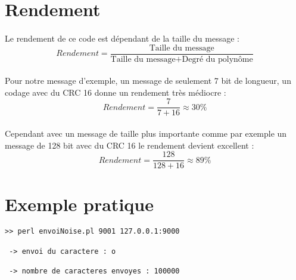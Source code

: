         \paragraph{}



    \section{Rendement}

        \paragraph{}
Le rendement de ce code est dépendant de la taille du message :
\[  Rendement = \frac{\text{Taille du message}}{\text{Taille du message} + \text{Degré du polynôme}} \]
        \paragraph{}
Pour notre message d'exemple, un message de seulement 7 bit de longueur, un codage avec du CRC 16 donne un rendement très médiocre :
\[  Rendement = \frac{7}{7 + 16} \approx 30\%  \]
        \paragraph{}
Cependant avec un message de taille plus importante comme par exemple un message de 128 bit avec du CRC 16 le rendement devient excellent :
\[  Rendement = \frac{128}{128 + 16} \approx 89\%  \]


    \section{Exemple pratique}
           \lstset{
                language=bash, basicstyle=\ttfamily\small, columns=flexible,
                tabsize=2, extendedchars=true, showspaces=false,
                showstringspaces=false, numbers=left, numberstyle=\tiny,
                breaklines=true, breakautoindent=true, captionpos=b
            }

    \begin{lstlisting}
>> perl envoiNoise.pl 9001 127.0.0.1:9000

 -> envoi du caractere : o

 -> nombre de caracteres envoyes : 100000

    \end{lstlisting}

